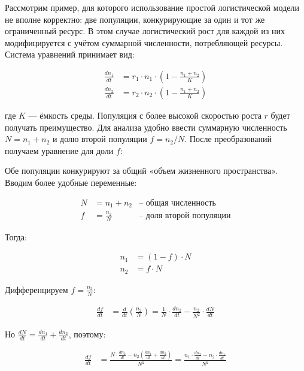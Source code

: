 \documentclass[a4paper, 14pt]{extarticle}
\begin{document}
Рассмотрим пример, для которого использование простой логистической модели не вполне корректно: две популяции, конкурирующие за один и тот же ограниченный ресурс. В этом случае логистический рост для каждой из них модифицируется с учётом суммарной численности, потребляющей ресурсы. Система уравнений принимает вид:

\begin{align}
    \frac{dn_1}{dt} &= r_1 \cdot n_1 \cdot \left(1 - \frac{n_1 + n_2}{K}\right) \label{eq:two_pop_1} \\
    \frac{dn_2}{dt} &= r_2 \cdot n_2 \cdot \left(1 - \frac{n_1 + n_2}{K}\right) \label{eq:two_pop_2}
\end{align}

где \(K\) — ёмкость среды. Популяция с более высокой скоростью роста $r$ будет получать преимущество. Для анализа удобно ввести суммарную численность \(N = n_1 + n_2\) и долю второй популяции \(f = n_2 / N\). После преобразований получаем уравнение для доли \(f\):

Обе популяции конкурируют за общий «объем жизненного пространства». Вводим более удобные переменные:

\begin{align}
    N &= n_1 + n_2 &\text{-- общая численность} \label{eq:N_def} \\
    f &= \frac{n_2}{N} &\text{-- доля второй популяции} \label{eq:f_def}
\end{align}

Тогда:

\begin{align}
    n_1 &= (1 - f) \cdot N \label{eq:n1_fN} \\
    n_2 &= f \cdot N \label{eq:n2_fN}
\end{align}

Дифференцируем $f = \frac{n_2}{N}$:

\begin{align}
    \frac{df}{dt} &= \frac{d}{dt}\left(\frac{n_2}{N}\right) = \frac{1}{N} \cdot \frac{dn_2}{dt} - \frac{n_2}{N^2} \cdot \frac{dN}{dt} \label{eq:df_dt_init}
\end{align}

Но $\frac{dN}{dt} = \frac{dn_1}{dt} + \frac{dn_2}{dt}$, поэтому:

\begin{align}
    \frac{df}{dt} &= \frac{N \cdot \frac{dn_2}{dt} - n_2\left(\frac{dn_1}{dt} + \frac{dn_2}{dt}\right)}{N^2} \nonumber = \frac{n_1 \cdot \frac{dn_2}{dt} - n_2 \cdot \frac{dn_1}{dt}}{N^2} \label{eq:df_dt_s}
\end{align}
\end{document}
